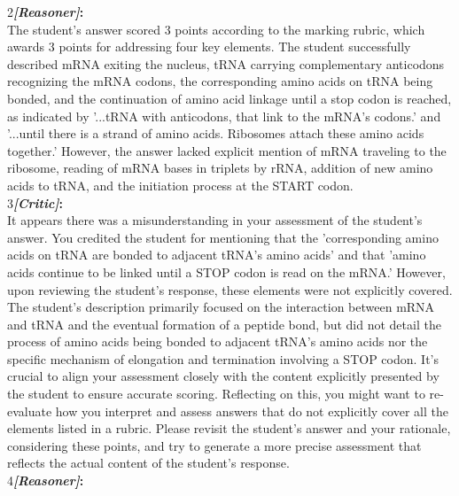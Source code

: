 \begin{figure*}
\begin{tcolorbox}[
    colback=gray!10,      %
    colframe=gray!80,     %
    title=Case Study 1,
    fonttitle=\bfseries,  %
    rounded corners,
    boxrule=0.5mm,        %
    width=\linewidth
]
\textcircled{\raisebox{-0.3pt} {\scriptsize2}}\textbf{\emph{[Reasoner]}:}\\
The student's answer scored 3 points according to the marking rubric, which awards 3 points for addressing four key elements. The student successfully described mRNA exiting the nucleus, tRNA carrying complementary anticodons recognizing the mRNA codons, the corresponding amino acids on tRNA being bonded, and the continuation of amino acid linkage until a stop codon is reached, as indicated by '...tRNA with anticodons, that link to the mRNA's codons.' and '...until there is a strand of amino acids. Ribosomes attach these amino acids together.' However, the answer lacked explicit mention of mRNA traveling to the ribosome, reading of mRNA bases in triplets by rRNA, addition of new amino acids to tRNA, and the initiation process at the START codon.\\
\textcircled{\raisebox{-0.3pt} {\scriptsize3}}\textbf{\emph{[Critic]}:}\\
It appears there was a misunderstanding in your assessment of the student's answer. You credited the student for mentioning that the 'corresponding amino acids on tRNA are bonded to adjacent tRNA's amino acids' and that 'amino acids continue to be linked until a STOP codon is read on the mRNA.' However, upon reviewing the student's response, these elements were not explicitly covered. The student's description primarily focused on the interaction between mRNA and tRNA and the eventual formation of a peptide bond, but did not detail the process of amino acids being bonded to adjacent tRNA's amino acids nor the specific mechanism of elongation and termination involving a STOP codon. It's crucial to align your assessment closely with the content explicitly presented by the student to ensure accurate scoring. Reflecting on this, you might want to re-evaluate how you interpret and assess answers that do not explicitly cover all the elements listed in a rubric. Please revisit the student's answer and your rationale, considering these points, and try to generate a more precise assessment that reflects the actual content of the student's response.\\
\textcircled{\raisebox{-0.3pt} {\scriptsize4}}\textbf{\emph{[Reasoner]}:}\\

\end{tcolorbox}
\end{figure*}
